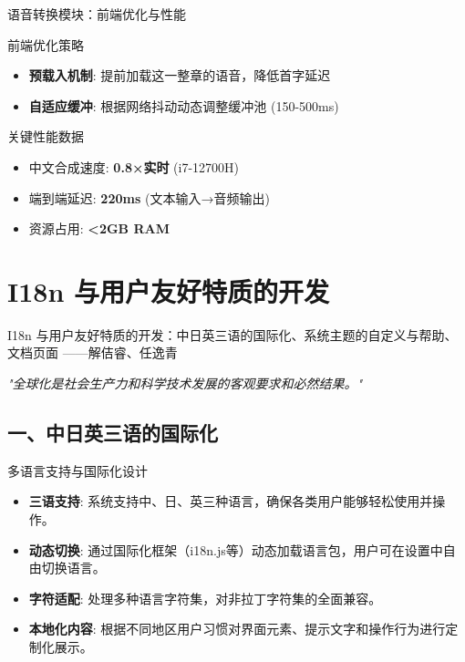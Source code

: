 \documentclass{beamer}
\begin{document}
\begin{frame}{语音转换模块：前端优化与性能}
    \begin{block}{前端优化策略}
        \begin{itemize}
            \item \textbf{预载入机制}: 提前加载这一整章的语音，降低首字延迟
            \item \textbf{自适应缓冲}: 根据网络抖动动态调整缓冲池 (150-500ms)
        \end{itemize}
    \end{block}
    \begin{alertblock}{关键性能数据}
        \begin{itemize}
            \item 中文合成速度: \textbf{0.8×实时} (i7-12700H)
            \item 端到端延迟: \textbf{220ms} (文本输入→音频输出)
            \item 资源占用: \textbf{<2GB RAM}
        \end{itemize}
    \end{alertblock}
\end{frame}

\section{I18n 与用户友好特质的开发}

\begin {frame}{I18n 与用户友好特质的开发：中日英三语的国际化、系统主题的自定义与帮助、文档页面
    \hfill ——解佶睿、任逸青}

\centering
\textit{"全球化是社会生产力和科学技术发展的客观要求和必然结果。"} \\
\vspace {1em}
\end{frame}

\subsection{一、中日英三语的国际化}
\begin{frame}{多语言支持与国际化设计}
    \begin{itemize}
        \item \textbf{三语支持}: 系统支持中、日、英三种语言，确保各类用户能够轻松使用并操作。
        \item \textbf{动态切换}: 通过国际化框架（i18n.js等）动态加载语言包，用户可在设置中自由切换语言。
        \item \textbf{字符适配}: 处理多种语言字符集，对非拉丁字符集的全面兼容。
        \item \textbf{本地化内容}: 根据不同地区用户习惯对界面元素、提示文字和操作行为进行定制化展示。
    \end{itemize}
\end{frame}
\end{document}
